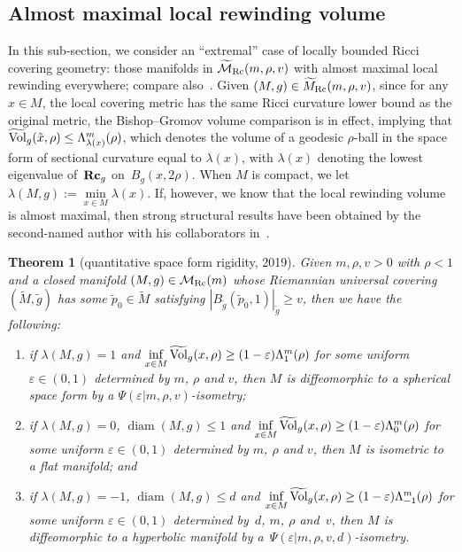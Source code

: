 \documentclass[pdftex]{sigma}
\numberwithin{equation}{section}
\newtheorem{Theorem}{Theorem}[section]
\DeclareMathOperator{\diam}{diam}
\newcommand{\Rc}{\operatorname{\bf Rc}}
\begin{document}
\subsection{Almost maximal local rewinding volume}\label{section3.2}
In this sub-section, we consider an ``extremal'' case of locally bounded
Ricci covering geometry: those manifolds in
$\widetilde{\mathcal{M}}_{\rm Rc}(m,\rho,v)$ with almost maximal local rewinding
everywhere; compare also~\cite{Colding96}. Given $(M,g)\in
\widetilde{M}_{\rm Rc}(m,\rho,v)$, since for any $x\in M$, the local covering
metric has the same Ricci curvature lower bound as the original metric, the
Bishop--Gromov volume comparison is in effect, implying that
$\widetilde{\rm Vol}_g(\tilde{x},\rho)\le \Lambda_{\lambda(x)}^m(\rho)$, which
denotes the volume of a geodesic $\rho$-ball in the space form of sectional
curvature equal to $\lambda(x)$, with $\lambda(x)$ denoting the lowest
eigenvalue of~$\Rc_g$ on~$B_g(x,2\rho)$. When $M$ is compact, we let
$\lambda(M,g):=\min\limits_{x\in M}\lambda(x)$. If, however, we know that the local
rewinding volume is almost maximal, then strong structural results have been
obtained by the second-named author with his collaborators in~\cite{CRX18, CRX19}.
\begin{Theorem}[quantitative space form rigidity, 2019]\label{thm: CRX19a}
Given $m,\rho,v>0$ with $\rho<1$ and a closed manifold $(M,g) \in
\mathcal{M}_{\rm Rc}(m)$ whose Riemannian universal covering $(\tilde{M},
\tilde{g})$ has some $\tilde{p}_0\in \tilde{M}$ satisfying $|B_{\tilde{g}}
(\tilde{p}_0,1) |_{\tilde{g}}\ge v$, then we have the following:
\begin{enumerate}\itemsep=0pt
 \item[$1)$] if $\lambda(M,g)=1$ and $\inf\limits_{x\in M}
 \widetilde{\rm Vol}_g(x,\rho)\ge (1-\varepsilon)\Lambda_{1}^m(\rho)$ for some
 uniform $\varepsilon\in (0,1)$ determined by $m$, $\rho$ and $v$, then $M$ is
 diffeomorphic to a spherical space form by a
 $\Psi(\varepsilon|m,\rho,v)$-isometry;
 \item[$2)$] if $\lambda(M,g)=0$, $\diam (M,g)\le 1$ and $\inf\limits_{x\in M}
 \widetilde{\rm Vol}_g(x,\rho)\ge (1-\varepsilon)\Lambda_0^m(\rho)$ for some
 uniform $\varepsilon\in (0,1)$ determined by $m$, $\rho$ and $v$, then $M$ is
 isometric to a flat manifold; and
 \item[$3)$] if $\lambda(M,g)=-1$, $\diam (M,g)\le d$ and $\inf\limits_{x\in M}
 \widetilde{\rm Vol}_g(x,\rho)\ge (1-\varepsilon)\Lambda_{-1}^m(\rho)$ for some
 uniform $\varepsilon\in (0,1)$ determined by~$d$, $m$, $\rho$ and~$v$, then
 $M$ is diffeomorphic to a hyperbolic manifold by a~$\Psi(\varepsilon|m,\rho,v,d)$-isometry.
\end{enumerate}
\end{Theorem}
\end{document}
